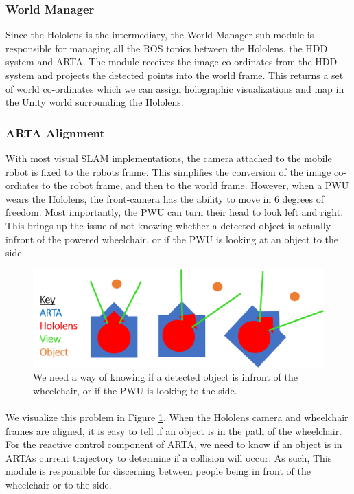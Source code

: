 \subsubsection{World Manager}
Since the Hololens is the intermediary, the World Manager sub-module is responsible for managing all the ROS topics between the Hololens, the HDD system and ARTA. The module receives the image co-ordinates from the HDD system and projects the detected points into the world frame. This returns a set of world co-ordinates which we can assign holographic visualizations and map in the Unity world surrounding the Hololens.

\subsubsection{ARTA Alignment} 
With most visual SLAM implementations, the camera attached to the mobile robot is fixed to the robots frame. This simplifies the conversion of the image co-ordiates to the robot frame, and then to the world frame. However, when a PWU wears the Hololens, the front-camera has the ability to move in 6 degrees of freedom. Most importantly, the PWU can turn their head to look left and right. This brings up the issue of not knowing whether a detected object is actually infront of the powered wheelchair, or if the PWU is looking at an object to the side. 

\begin{figure}[ht!]
	\centering
	\includegraphics[width=0.9\linewidth]{img/chapter4_analysis/holoArtaAligned.png}
	\caption{We need a way of knowing if a detected object is infront of the wheelchair, or if the PWU is looking to the side. }
	\label{fig:holoArtaAlignment}
\end{figure}

\paragraph{}We visualize this problem in Figure \ref{fig:holoArtaAlignment}. When the Hololens camera and wheelchair frames are aligned, it is easy to tell if an object is in the path of the wheelchair. For the reactive control component of ARTA, we need to know if an object is in ARTAs current trajectory to determine if a collision will occur. As such, This module is responsible for discerning between people being in front of the wheelchair or to the side. 

